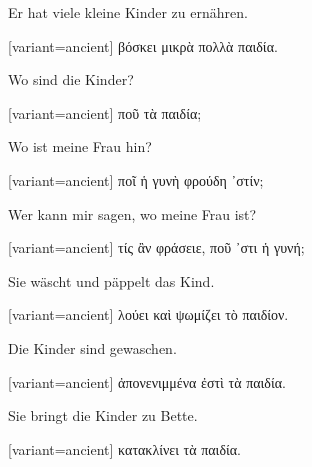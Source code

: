 Er hat viele kleine Kinder zu ernähren.

\switchcolumn

\begin{greek}[variant=ancient]%
βόσκει μικρὰ πολλὰ παιδία.

\end{greek}%
\switchcolumn*

Wo sind die Kinder?

\switchcolumn

\begin{greek}[variant=ancient]%
ποῦ τὰ παιδία;

\end{greek}%
\switchcolumn*

Wo ist meine Frau hin?

\switchcolumn

\begin{greek}[variant=ancient]%
ποῖ ἡ γυνὴ φρούδη ᾽στίν;

\end{greek}%
\switchcolumn*

Wer kann mir sagen, wo meine Frau ist?

\switchcolumn

\begin{greek}[variant=ancient]%
τίς ἂν φράσειε, ποῦ ᾽στι ἡ γυνή;

\end{greek}%
\switchcolumn*

Sie wäscht und päppelt das Kind.

\switchcolumn

\begin{greek}[variant=ancient]%
λούει καὶ ψωμίζει τὸ παιδίον.

\end{greek}%
\switchcolumn*

Die Kinder sind gewaschen.

\switchcolumn

\begin{greek}[variant=ancient]%
ἀπονενιμμένα ἐστὶ τὰ παιδία.

\end{greek}%
\switchcolumn*

Sie bringt die Kinder zu Bette.

\switchcolumn

\begin{greek}[variant=ancient]%
κατακλίνει τὰ παιδία.

\end{greek}%
\switchcolumn*

